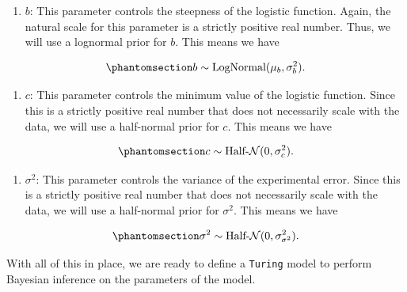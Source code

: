 \documentclass[
]{scrartcl}
\providecommand{\tightlist}{%
  \setlength{\itemsep}{0pt}\setlength{\parskip}{0pt}}\usepackage{longtable,booktabs,array}
\begin{document}
\begin{enumerate}
\def\labelenumi{\arabic{enumi}.}
\setcounter{enumi}{2}
\tightlist
\item
  \(b\): This parameter controls the steepness of the logistic function.
  Again, the natural scale for this parameter is a strictly positive
  real number. Thus, we will use a lognormal prior for \(b\). This means
  we have
\end{enumerate}

\begin{equation}\phantomsection\label{eq-iwasawa-prior-b}{
b \sim \text{LogNormal}(\mu_b, \sigma_b^2).
}\end{equation}

\begin{enumerate}
\def\labelenumi{\arabic{enumi}.}
\setcounter{enumi}{3}
\tightlist
\item
  \(c\): This parameter controls the minimum value of the logistic
  function. Since this is a strictly positive real number that does not
  necessarily scale with the data, we will use a half-normal prior for
  \(c\). This means we have
\end{enumerate}

\begin{equation}\phantomsection\label{eq-iwasawa-prior-c}{
c \sim \text{Half-}\mathcal{N}(0, \sigma_c^2).
}\end{equation}

\begin{enumerate}
\def\labelenumi{\arabic{enumi}.}
\setcounter{enumi}{4}
\tightlist
\item
  \(\sigma^2\): This parameter controls the variance of the experimental
  error. Since this is a strictly positive real number that does not
  necessarily scale with the data, we will use a half-normal prior for
  \(\sigma^2\). This means we have
\end{enumerate}

\begin{equation}\phantomsection\label{eq-iwasawa-prior-sigma2}{
\sigma^2 \sim \text{Half-}\mathcal{N}(0, \sigma_{\sigma^2}^2).
}\end{equation}

With all of this in place, we are ready to define a \texttt{Turing}
model to perform Bayesian inference on the parameters of the model.
\end{document}
